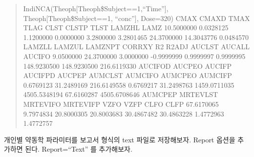 \documentclass[12pt,]{krantz}
\theoremstyle{definition}
\theoremstyle{definition}
\theoremstyle{definition}
\theoremstyle{remark}
\begin{document}
\begin{quote}
IndiNCA(Theoph{[}Theoph\$Subject==1,``Time''{]},
Theoph{[}Theoph\$Subject==1, ``conc''{]}, Dose=320) CMAX CMAXD TMAX TLAG
CLST CLSTP TLST LAMZHL LAMZ 10.5000000 0.0328125 1.1200000 0.0000000
3.2800000 3.2801465 24.3700000 14.3043776 0.0484570 LAMZLL LAMZUL
LAMZNPT CORRXY R2 R2ADJ AUCLST AUCALL AUCIFO 9.0500000 24.3700000
3.0000000 -0.9999999 0.9999997 0.9999995 148.9230500 148.9230500
216.6119330 AUCIFOD AUCPEO AUCIFP AUCIFPD AUCPEP AUMCLST AUMCIFO AUMCPEO
AUMCIFP 0.6769123 31.2489169 216.6149558 0.6769217 31.2498763
1459.0711035 4505.5348194 67.6160287 4505.6708646 AUMCPEP MRTEVLST
MRTEVIFO MRTEVIFP VZFO VZFP CLFO CLFP 67.6170065 9.7974834 20.8000305
20.8003683 30.4867482 30.4863228 1.4772963 1.4772757
\end{quote}

개인별 약동학 파라미터를 보고서 형식의 text 파일로 저장해보자. Report
옵션을 추가하면 된다. Report=``Text'' 를 추가해보자.
\end{document}
